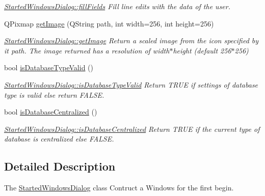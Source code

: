 \begin{DoxyCompactItemize}
\begin{DoxyCompactList}\small\item\em \hyperlink{classGui_1_1Dialogs_1_1StartedWindowsDialog_a30d97171779c86ecc497ef6990829fca}{Started\-Windows\-Dialog\-::fill\-Fields} Fill line edits with the data of the user. \end{DoxyCompactList}\item 
Q\-Pixmap \hyperlink{classGui_1_1Dialogs_1_1StartedWindowsDialog_ae3e9ade2f5949d5fb57e06c54106609f}{get\-Image} (Q\-String path, int width=256, int height=256)
\begin{DoxyCompactList}\small\item\em \hyperlink{classGui_1_1Dialogs_1_1StartedWindowsDialog_ae3e9ade2f5949d5fb57e06c54106609f}{Started\-Windows\-Dialog\-::get\-Image} Return a scaled image from the icon specified by it {\itshape path}. The image returned has a resolution of {\itshape width}$\ast${\itshape height} (default 256$\ast$256) \end{DoxyCompactList}\item 
bool \hyperlink{classGui_1_1Dialogs_1_1StartedWindowsDialog_ad582a62ec4204c2ef5081c5431824491}{is\-Database\-Type\-Valid} ()
\begin{DoxyCompactList}\small\item\em \hyperlink{classGui_1_1Dialogs_1_1StartedWindowsDialog_ad582a62ec4204c2ef5081c5431824491}{Started\-Windows\-Dialog\-::is\-Database\-Type\-Valid} Return T\-R\-U\-E if settings of database type is valid else return F\-A\-L\-S\-E. \end{DoxyCompactList}\item 
bool \hyperlink{classGui_1_1Dialogs_1_1StartedWindowsDialog_ac5127ad449080835c6f3bb572fb3e481}{is\-Database\-Centralized} ()
\begin{DoxyCompactList}\small\item\em \hyperlink{classGui_1_1Dialogs_1_1StartedWindowsDialog_ac5127ad449080835c6f3bb572fb3e481}{Started\-Windows\-Dialog\-::is\-Database\-Centralized} Return T\-R\-U\-E if the current type of database is centralized else F\-A\-L\-S\-E. \end{DoxyCompactList}\end{DoxyCompactItemize}


\subsection{Detailed Description}
The \hyperlink{classGui_1_1Dialogs_1_1StartedWindowsDialog}{Started\-Windows\-Dialog} class Contruct a Windows for the first begin. 

